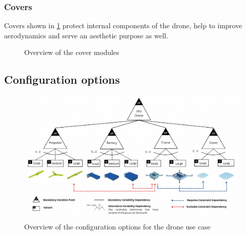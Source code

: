 \documentclass[sigconf,review]{acmart}
\begin{document}
\subsubsection{Covers}
\label{sec:covers}

Covers shown in \cref{fig:atomic-modules} protect internal components of the drone, help to improve aerodynamics and serve an aesthetic purpose as well.

\begin{figure}[htbp]
    \hfill
    \caption{Overview of the cover modules}
    \label{fig:atomic-modules}
\end{figure}

\subsection{Configuration options}
\label{sec:configuration-options}

\begin{figure}[htbp]
    \includegraphics[width=\textwidth]{./FeatureTreeWithLegend3.jpg}
    \caption{Overview of the configuration options for the drone use case}
    \label{fig:feature-tree}
\end{figure}
\end{document}
